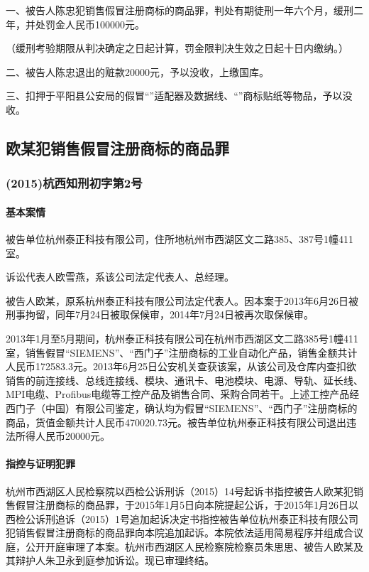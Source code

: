 \documentclass[
    a4paper
    ]{ctexart}
\begin{document}
{\begin{sloppy}
一、被告人陈忠犯销售假冒注册商标的商品罪，判处有期徒刑一年六个月，缓刑二年，并处罚金人民币100000元。

（缓刑考验期限从判决确定之日起计算，罚金限判决生效之日起十日内缴纳。）

二、被告人陈忠退出的赃款20000元，予以没收，上缴国库。

三、扣押于平阳县公安局的假冒“”适配器及数据线、“”商标贴纸等物品，予以没收。


\subsection{欧某犯销售假冒注册商标的商品罪}
\subsubsection*{(2015)杭西知刑初字第2号}
\paragraph{基本案情}
被告单位杭州泰正科技有限公司，住所地杭州市西湖区文二路385、387号1幢411室。

诉讼代表人欧雪燕，系该公司法定代表人、总经理。

被告人欧某，原系杭州泰正科技有限公司法定代表人。因本案于2013年6月26日被刑事拘留，同年7月24日被取保候审，2014年7月24日被再次取保候审。

2013年1月至5月期间，杭州泰正科技有限公司在杭州市西湖区文二路385号1幢411室，销售假冒“SIEMENS”、“西门子”注册商标的工业自动化产品，销售金额共计人民币172583.3元。2013年6月25日公安机关查获该案，从该公司及仓库内查扣欲销售的前连接线、总线连接线、模块、通讯卡、电池模块、电源、导轨、延长线、MPI电缆、Profibus电缆等工控产品及销售合同、采购合同若干。上述工控产品经西门子（中国）有限公司鉴定，确认均为假冒“SIEMENS”、“西门子”注册商标的商品，货值金额共计人民币470020.73元。被告单位杭州泰正科技有限公司退出违法所得人民币20000元。

\paragraph{指控与证明犯罪}
杭州市西湖区人民检察院以西检公诉刑诉（2015）14号起诉书指控被告人欧某犯销售假冒注册商标的商品罪，于2015年1月5日向本院提起公诉，于2015年1月26日以西检公诉刑追诉（2015）1号追加起诉决定书指控被告单位杭州泰正科技有限公司犯销售假冒注册商标的商品罪向本院追加起诉。本院依法适用简易程序并组成合议庭，公开开庭审理了本案。杭州市西湖区人民检察院检察员朱思思、被告人欧某及其辩护人朱卫永到庭参加诉讼。现已审理终结。





\end{sloppy}}
\end{document}
